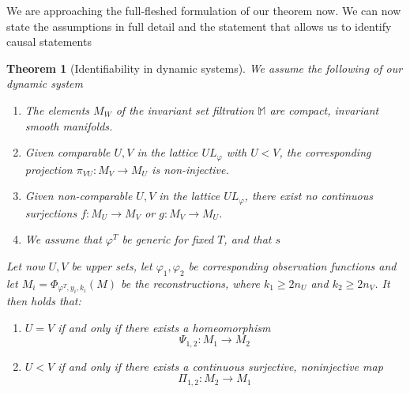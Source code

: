 \documentclass[11pt, a4paper]{memoir}
\theoremstyle{plain}
\newtheorem{thm}{Theorem}
\theoremstyle{definition}
\begin{document}
We are approaching the full-fleshed formulation of our theorem now. We can now state the assumptions in full detail and the statement that allows us to identify causal statements
\begin{thm}[Identifiability in dynamic systems]
We assume the following of our dynamic system
\begin{enumerate}[label=(I\arabic*)]
	\item The elements $M_W$ of the invariant set filtration $\mathbb{M}$ are compact, invariant \emph{smooth} manifolds. 
	\item Given comparable $U,V$ in the lattice $UL_\varphi$ with $U<V$, the corresponding projection $\pi_{VU}:M_V\to M_U$ is non-injective.
	\item Given non-comparable $U,V$ in the lattice $UL_\varphi$, there exist no continuous surjections $f:M_U\to M_V$ or $g:M_V\to M_U$.
	\item We assume that $\varphi^T$ be generic for fixed $T$, and that $s$
\end{enumerate}
Let now $U,V$ be upper sets, let $\varphi_1,\varphi_2$ be corresponding observation functions and let $M_i=\Phi_{\varphi^T,y_i,k_i}(M)$ be the reconstructions, where $k_1\geq 2n_U$ and $k_2\geq 2n_V$. It then holds that:
\begin{enumerate}[label=\roman*.]
	\item $U=V$ if and only if there exists a homeomorphism
	$$\Psi_{1,2}:M_1\to M_2$$
	\item $U<V$ if and only if there exists a continuous surjective, noninjective map
	$$\Pi_{1,2}:M_2\to M_1$$ 
\end{enumerate}
\end{thm}
\end{document}
